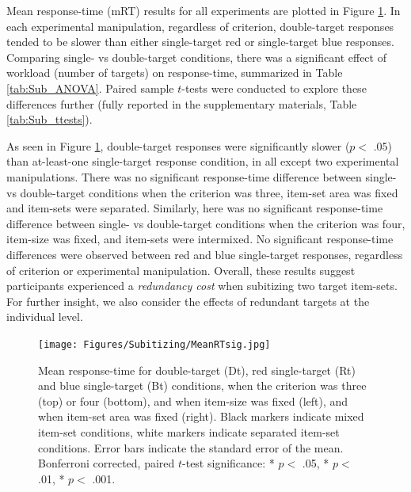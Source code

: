 Mean response-time (mRT) results for all experiments are plotted in Figure \ref{fig:subMeanRT}. In each experimental manipulation, regardless of criterion, double-target responses tended to be slower than either single-target red or single-target blue responses. Comparing single- vs double-target conditions, there was a significant effect of workload (number of targets) on response-time, summarized in Table \ref{tab:Sub_ANOVA}. Paired sample $t$-tests were conducted to explore these differences further (fully reported in the supplementary materials, Table \ref{tab:Sub_ttests}). 


As seen in Figure \ref{fig:subMeanRT}, double-target responses were significantly slower ($p <$ .05) than at-least-one single-target response condition, in all except two experimental manipulations. There was no significant response-time difference between single- vs double-target conditions when the criterion was three, item-set area was fixed and item-sets were separated. Similarly, here was no significant response-time difference between single- vs double-target conditions when the criterion was four, item-size was fixed, and item-sets were intermixed. No significant response-time differences were observed between red and blue single-target responses, regardless of criterion or experimental manipulation. Overall, these results suggest participants experienced a \textit{redundancy cost} when subitizing two target item-sets. For further insight, we also consider the effects of redundant targets at the individual level.

\begin{figure}[hbt]
\centering \texttt{[image: Figures/Subitizing/MeanRTsig.jpg]}
\caption{Mean response-time for double-target (Dt), red single-target (Rt) and blue single-target (Bt) conditions, when the criterion was three (top) or four (bottom), and when item-size was fixed (left), and when item-set area was fixed (right). Black markers indicate mixed item-set conditions, white markers indicate separated item-set conditions. Error bars indicate the standard error of the mean. Bonferroni corrected, paired $t$-test significance: * $p <$ .05, * $p <$ .01, * $p <$ .001. }
\label{fig:subMeanRT}
\end{figure}

